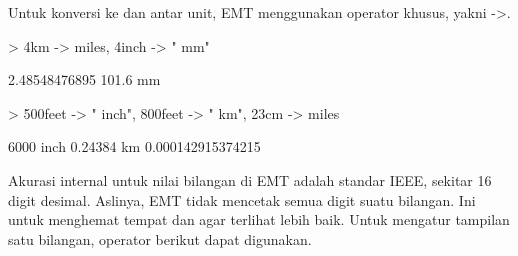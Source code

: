 \documentclass[a4paper,10pt]{article}
\begin{document}
\begin{eulernotebook}
\begin{eulercomment}
\begin{eulercomment}
\begin{eulercomment}
Untuk konversi ke dan antar unit, EMT menggunakan operator khusus,
yakni -\textgreater{}.
\end{eulercomment}
\begin{eulerprompt}
> 4km -> miles, 4inch -> " mm"
\end{eulerprompt}
\begin{euleroutput}
  2.48548476895
  101.6 mm
\end{euleroutput}
\begin{eulerprompt}
> 500feet -> " inch", 800feet -> " km", 23cm -> miles
\end{eulerprompt}
\begin{euleroutput}
  6000 inch
  0.24384 km
  0.000142915374215
\end{euleroutput}
\begin{eulercomment}
Akurasi internal untuk nilai bilangan di EMT adalah standar IEEE,
sekitar 16 digit desimal. Aslinya, EMT tidak mencetak semua digit
suatu bilangan. Ini untuk menghemat tempat dan agar terlihat lebih
baik. Untuk mengatur tampilan satu bilangan, operator berikut dapat
digunakan.


\end{eulercomment}
\end{eulercomment}
\end{eulercomment}
\end{eulernotebook}
\end{document}
